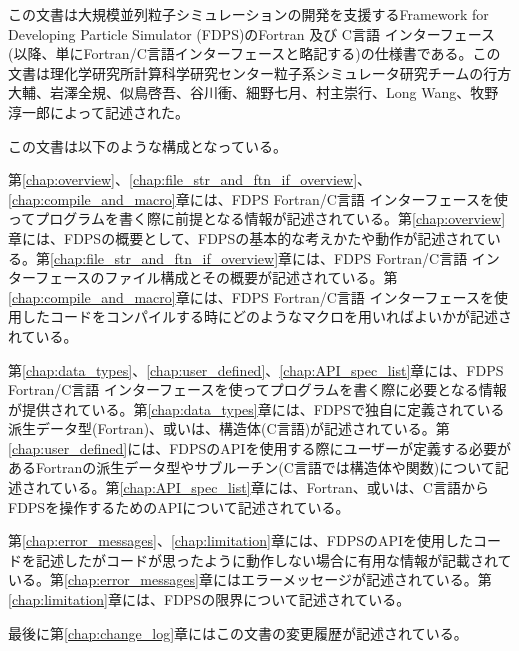 この文書は大規模並列粒子シミュレーションの開発を支援するFramework for
Developing Particle Simulator (FDPS)のFortran 及び C言語 インターフェース(以降、単にFortran/C言語インターフェースと略記する)の仕様書である。この文書は理化学研究所計算科学研究センター粒子系シミュレータ研究チームの行方大輔、岩澤全規、似鳥啓吾、谷川衝、細野七月、村主崇行、Long Wang、牧野淳一郎によって記述された。


この文書は以下のような構成となっている。

第\ref{chap:overview}、\ref{chap:file_str_and_ftn_if_overview}、\ref{chap:compile_and_macro}章には、FDPS Fortran/C言語 インターフェースを使ってプログラムを書く際に前提となる情報が記述されている。第\ref{chap:overview}章には、FDPSの概要として、FDPSの基本的な考えかたや動作が記述されている。第\ref{chap:file_str_and_ftn_if_overview}章には、FDPS Fortran/C言語 インターフェースのファイル構成とその概要が記述されている。第\ref{chap:compile_and_macro}章には、FDPS Fortran/C言語 インターフェースを使用したコードをコンパイルする時にどのようなマクロを用いればよいかが記述されている。

第\ref{chap:data_types}、\ref{chap:user_defined}、\ref{chap:API_spec_list}章には、FDPS Fortran/C言語 インターフェースを使ってプログラムを書く際に必要となる情報が提供されている。第\ref{chap:data_types}章には、FDPSで独自に定義されている派生データ型(Fortran)、或いは、構造体(C言語)が記述されている。第\ref{chap:user_defined}には、FDPSのAPIを使用する際にユーザーが定義する必要があるFortranの派生データ型やサブルーチン(C言語では構造体や関数)について記述されている。第\ref{chap:API_spec_list}章には、Fortran、或いは、C言語からFDPSを操作するためのAPIについて記述されている。

第\ref{chap:error_messages}、\ref{chap:limitation}章には、FDPSのAPIを使用したコードを記述したがコードが思ったように動作しない場合に有用な情報が記載されている。第\ref{chap:error_messages}章にはエラーメッセージが記述されている。第\ref{chap:limitation}章には、FDPSの限界について記述されている。

最後に第\ref{chap:change_log}章にはこの文書の変更履歴が記述されている。
